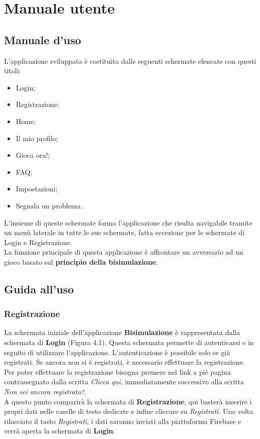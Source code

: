 \documentclass[a4paper,11pt,twoside,openright]{report}
\begin{document}
\chapter{Manuale utente}
\section{Manuale d'uso}
L'applicazione sviluppata è costituita dalle seguenti schermate elencate con questi titoli:

\begin{itemize}
\item Login;

\item Registrazione;

\item Home;

\item Il mio profilo;

\item Gioca ora!;

\item FAQ;

\item Impostazioni;

\item Segnala un problema.
\end{itemize}

L'insieme di queste schermate forma l'applicazione che risulta navigabile tramite un menù laterale in tutte le sue schermate, fatta eccezione per le schermate di Login e Registrazione.\\
La funzione principale di questa applicazione è affrontare un avversario ad un gioco basato sul \textbf{principio della bisimulazione}. 

\section{Guida all'uso}
\subsection{Registrazione}
La schermata iniziale dell'applicazione \textbf{Bisimulazione} è rappresentata dalla schermata di \textbf{Login} (Figura 4.1). Questa schermata permette di autenticarsi e in 
seguito di utilizzare l'applicazione. L'autenticazione è possibile solo se già registrati. Se ancora non si è registrati, è necessario effettuare la registrazione.\\
Per poter effettuare la registrazione bisogna premere nel link a piè pagina contrassegnato dalla scritta \textit{Clicca qui}, immediatamente successivo
alla scritta \textit{Non sei ancora registrato?}.\\
A questo punto comparirà la schermata di \textbf{Registrazione}; qui basterà inserire i propri dati nelle caselle di testo dedicate e infine cliccare su \textit{Registrati}.
Una volta rilasciato il tasto \textit{Registrati}, i dati saranno inviati alla piattaforma Firebase e verrà aperta la schermata di \textbf{Login}.
\end{document}
